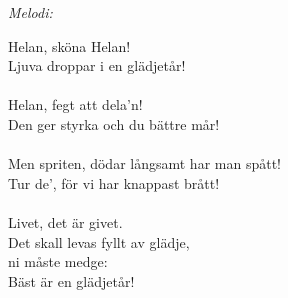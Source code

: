 {\footnotesize\textit{Melodi: }}\par
\vspace{10pt}
Helan, sköna Helan!\\
Ljuva droppar i en glädjetår!\\
\\
Helan, fegt att dela'n!\\
Den ger styrka och du bättre mår!\\
\\
Men spriten, dödar långsamt har man spått!\\
Tur de', för vi har knappast brått!\\
\\
Livet, det är givet.\\
Det skall levas fyllt av glädje,\\
ni måste medge:\\
Bäst är en glädjetår!
